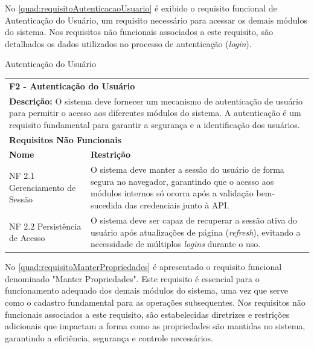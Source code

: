 \clearpage

No \autoref{quad:requisitoAutenticacaoUsuario} é exibido o requisito funcional de Autenticação do Usuário, um requisito necessário para acessar os demais módulos do sistema. Nos requisitos não funcionais associados a este requisito, são detalhados os dados utilizados no processo de autenticação (\textit{login}).

\begin{tabframed}[htb]
  \caption{Autenticação do Usuário}
  \label{quad:requisitoAutenticacaoUsuario}
  \renewcommand{\arraystretch}{1.5}
  \begin{tabular}{|l|l|}
    \cline{1-2}
    \multicolumn{2}{|l|}{\textbf{F2 - Autenticação do Usuário}}
    \\ \cline{1-2}

    \multicolumn{2}{|p{15cm}|}{
    \raggedright \textbf{Descrição:} O sistema deve fornecer um mecanismo de autenticação de usuário para permitir o acesso aos diferentes módulos do sistema. A autenticação é um requisito fundamental para garantir a segurança e a identificação dos usuários.
    }
    \\ \cline{1-2}

    \multicolumn{2}{|l|}{\textbf{Requisitos Não Funcionais}}
    \\ \cline{1-2}

    \textbf{Nome}                    &
    \textbf{Restrição}
    \\ \cline{1-2}

    NF 2.1 Gerenciamento de Sessão &
    \multicolumn{1}{|p{9cm}|}{\raggedright O sistema deve manter a sessão do usuário de forma segura no navegador, garantindo que o acesso aos módulos internos só ocorra após a validação bem-sucedida das credenciais junto à \gls{API}.}
    \\ \cline{1-2}

    NF 2.2 Persistência de Acesso      &
    \multicolumn{1}{|p{9cm}|}{\raggedright O sistema deve ser capaz de recuperar a sessão ativa do usuário após atualizações de página (\textit{refresh}), evitando a necessidade de múltiplos \textit{logins} durante o uso.}
    \\ \cline{1-2}
  \end{tabular}
  \fonte{} %
\end{tabframed}

\clearpage

No \autoref{quad:requisitoManterPropriedades} é apresentado o requisito funcional denominado "Manter Propriedades". Este requisito é essencial para o funcionamento adequado dos demais módulos do sistema, uma vez que serve como o cadastro fundamental para as operações subsequentes. Nos requisitos não funcionais associados a este requisito, são estabelecidas diretrizes e restrições adicionais que impactam a forma como as propriedades são mantidas no sistema, garantindo a eficiência, segurança e controle necessários.

